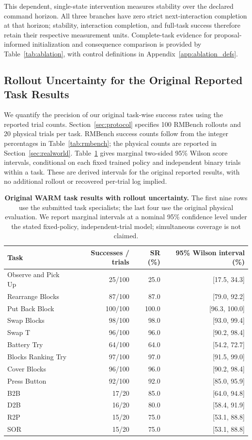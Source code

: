 This dependent, single-state intervention measures stability over the declared command horizon.
All three branches have zero strict next-interaction completion at that horizon; stability, interaction completion, and full-task success therefore retain their respective measurement units.
Complete-task evidence for proposal-informed initialization and consequence comparison is provided by Table~\ref{tab:ablation}, with control definitions in Appendix~\ref{app:ablation_defs}.

\subsection{Rollout Uncertainty for the Original Reported Task Results}
\label{app:reported_intervals}
We quantify the precision of our original task-wise success rates using the reported trial counts. Section~\ref{sec:protocol} specifies 100 RMBench rollouts and 20 physical trials per task. RMBench success counts follow from the integer percentages in Table~\ref{tab:rmbench}; the physical counts are reported in Section~\ref{sec:realworld}. Table~\ref{tab:reported_intervals} gives marginal two-sided 95\% Wilson score intervals, conditional on each fixed trained policy and independent binary trials within a task. These are derived intervals for the original reported results, with no additional rollout or recovered per-trial log implied.

\begin{table}[H]
\centering\small
\caption{\textbf{Original WARM task results with rollout uncertainty.} The first nine rows use the submitted task specialists; the last four use the original physical evaluation. We report marginal intervals at a nominal 95\% confidence level under the stated fixed-policy, independent-trial model; simultaneous coverage is not claimed.}
\label{tab:reported_intervals}
\begin{tabular}{lrrr}\toprule
Task & Successes / trials & SR (\%) & 95\% Wilson interval (\%)\\\midrule
Observe and Pick Up & 25/100 & 25.0 & [17.5, 34.3]\\
Rearrange Blocks & 87/100 & 87.0 & [79.0, 92.2]\\
Put Back Block & 100/100 & 100.0 & [96.3, 100.0]\\
Swap Blocks & 98/100 & 98.0 & [93.0, 99.4]\\
Swap T & 96/100 & 96.0 & [90.2, 98.4]\\
Battery Try & 64/100 & 64.0 & [54.2, 72.7]\\
Blocks Ranking Try & 97/100 & 97.0 & [91.5, 99.0]\\
Cover Blocks & 96/100 & 96.0 & [90.2, 98.4]\\
Press Button & 92/100 & 92.0 & [85.0, 95.9]\\
B2B & 17/20 & 85.0 & [64.0, 94.8]\\
D2B & 16/20 & 80.0 & [58.4, 91.9]\\
R2P & 15/20 & 75.0 & [53.1, 88.8]\\
SOR & 15/20 & 75.0 & [53.1, 88.8]\\
\bottomrule\end{tabular}

\end{table}

